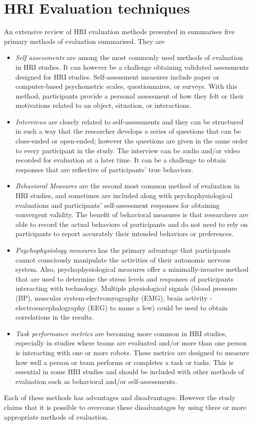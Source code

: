 {\section{HRI Evaluation techniques}
	An extensive review of HRI evaluation methods presented in \cite{bethel2010review} summarises five primary methods of evaluation summarised. They are
\begin{itemize}
\item \emph{Self assessments} are among the most commonly used methods of evaluation in HRI studies. It can however be a challenge obtaining validated assessments designed for HRI studies. Self-assessment measures include paper or computer-based psychometric scales, questionnaires, or surveys. With this method, participants provide a personal assessment of how they felt or their motivations related to an object, situation, or interactions.
\item \emph{Interviews} are closely related to self-assessments and they can be structured in such a way that  the researcher develops a series of questions that can be close-ended or open-ended; however the questions are given in the same order to every participant in the study. The interview can be audio and/or video recorded for evaluation at a later time. It can be a challenge to obtain responses that are reflective of participants’ true behaviors.
\item \emph{Behavioral Measures} are the second most common method of evaluation in HRI studies, and sometimes are included along with psychophysiological evaluations and participants’ self-assessment responses for obtaining convergent validity. The benefit of behavioral measures is that researchers are able to record the actual behaviors of participants and do not need to rely on participants to report accurately their intended behaviors or preferences.
\item \emph{Psychophysiology measures} has the primary advantage that participants cannot consciously manipulate the activities of their autonomic nervous system. Also, psychophysiological measures offer a minimally-invasive method that are used to determine the stress levels and responses of participants interacting with technology. Multiple physiological signals (blood pressure (BP), muscular system-electromyography (EMG), brain activity - electroencephalography (EEG) to name a few) could be used to obtain correlations in the results.
\item \emph{Task performance metrics} are becoming more common in HRI studies, especially in studies where teams are evaluated and/or more than one person is interacting with one or more robots. These metrics are designed to measure how well a person or team performs or completes a task or tasks. This is essential in some HRI studies and should be included with other methods of evaluation such as behavioral and/or self-assessments.
\end{itemize}
Each of these methods has advantages and disadvantages. However the study claims that it is possible to overcome these disadvantages by using three or more appropriate methods of evaluation. 

}
